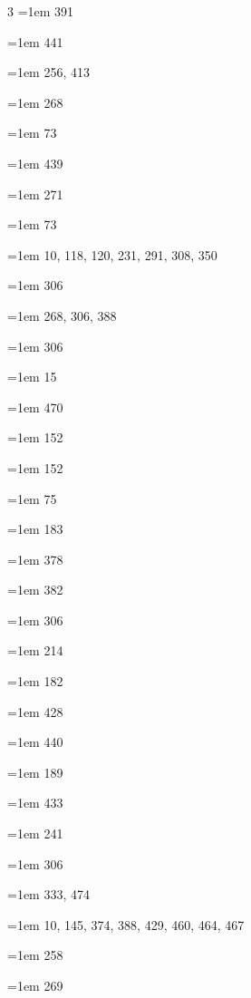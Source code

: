 \begin{multicols}{3}
\hangindent=1em  391\par
\hangindent=1em  441\par
\hangindent=1em  256, 413\par
\hangindent=1em  268\par
\hangindent=1em  73\par
\hangindent=1em  439\par
\hangindent=1em  271\par
\hangindent=1em  73\par
\hangindent=1em  10, 118, 120, 231, 291, 308, 350\par
\hangindent=1em  306\par
\hangindent=1em  268, 306, 388\par
\hangindent=1em  306\par
\hangindent=1em  15\par
\hangindent=1em  470\par
\hangindent=1em  152\par
\hangindent=1em  152\par
\hangindent=1em  75\par
\hangindent=1em  183\par
\hangindent=1em  378\par
\hangindent=1em  382\par
\hangindent=1em  306\par
\hangindent=1em  214\par
\hangindent=1em  182\par
\hangindent=1em  428\par
\hangindent=1em  440\par
\hangindent=1em  189\par
\hangindent=1em  433\par
\hangindent=1em  241\par
\hangindent=1em  306\par
\hangindent=1em  333, 474\par
\hangindent=1em  10, 145, 374, 388, 429, 460, 464, 467\par
\hangindent=1em  258\par
\hangindent=1em  269\par

\end{multicols}

